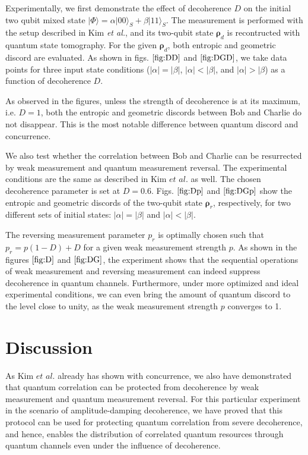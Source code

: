 \documentclass[%
 reprint,
 amsmath,amssymb,
 aps,
]{revtex4-1}
\begin{document}
\noindent Experimentally, we first demonstrate the effect of decoherence $D$ on the initial two qubit mixed state $|\Phi\rangle = \alpha |00\rangle_S + \beta |11\rangle_S$. The measurement is performed with the setup described in Kim \textit{et al.}, and its two-qubit state $\boldsymbol{\rho}_d$ is recontructed with quantum state tomography. For the given $\boldsymbol{\rho}_d$, both entropic and geometric discord are evaluated. As shown in figs. $\ref{fig:DD}$ and $\ref{fig:DGD}$, we take data points for three input state conditions ($|\alpha|=|\beta|$, $|\alpha|<|\beta|$, and $|\alpha|>|\beta$) as a function of decoherence $D$.

As observed in the figures, unless the strength of decoherence is at its maximum, i.e. $D=1$, both the entropic and geometric discords between Bob and Charlie do not disappear. This is the most notable difference between quantum discord and concurrence. 

We also test whether the correlation between Bob and Charlie can be resurrected by weak measurement and quantum measurement reversal. The experimental conditions are the same as described in Kim $\textit{et al.}$ as well. The chosen decoherence parameter is set at $D=0.6$. Figs. $\ref{fig:Dp}$ and $\ref{fig:DGp}$ show the entropic and geometric discords of the two-qubit state $\boldsymbol{\rho}_r$, respectively, for two different sets of initial states: $|\alpha|=|\beta|$ and $|\alpha|<|\beta|$.

The reversing measurement parameter $p_r$ is optimally chosen such that $p_r=p(1-D)+D$ for a given weak measurement strength $p$. As shown in the figures $\ref{fig:D}$ and $\ref{fig:DG}$, the experiment shows that the sequential operations of weak measurement and reversing measurement can indeed suppress decoherence in quantum channels. Furthermore, under more optimized and ideal experimental conditions, we can even bring the amount of quantum discord to the level close to unity, as the weak measurement strength $p$ converges to 1.

\section{Discussion}
\noindent As Kim $\textit{et al.}$ already has shown with concurrence, we also have demonstrated that quantum correlation can be protected from decoherence by weak measurement and quantum measurement reversal. For this particular experiment in the scenario of amplitude-damping decoherence, we have proved that this protocol can be used for protecting quantum correlation from severe decoherence, and hence, enables the distribution of correlated quantum resources through quantum channels even under the influence of decoherence.
\end{document}
